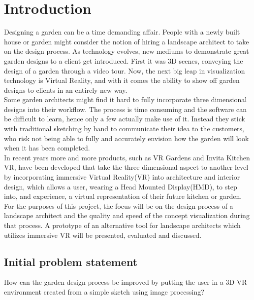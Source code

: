 \chapter{Introduction}
	Designing a garden can be a time demanding affair. People with a newly built house or garden might consider the notion of hiring a landscape architect to take on the design process. As technology evolves, new mediums to demonstrate great garden designs to a client get introduced\cite{landscapeArchitectureDigiTech}. First it was 3D scenes, conveying the design of a garden through a video tour. Now, the next big leap in visualization technology is Virtual Reality\cite{VRS}, and with it comes the ability to show off garden designs to clients in an entirely new way.\\
	
	Some garden architects might find it hard to fully incorporate three dimensional designs into their workflow. The process is time consuming and the software can be difficult to learn, hence only a few actually make use of it. Instead they stick with traditional sketching by hand to communicate their idea to the customers, who risk not being able to fully and accurately envision how the garden will look when it has been completed.\\
	
	In recent years more and more products, such as VR Gardens and Invita Kitchen VR, have been developed that take the three dimensional aspect to another level by incorporating immersive Virtual Reality(VR) into architecture and interior design, which allows a user, wearing a Head Mounted Display(HMD), to step into, and experience, a virtual representation of their future kitchen or garden.\\
	
	For the purposes of this project, the focus will be on the design process of a landscape architect and the quality and speed of the concept visualization during that process. A prototype of an alternative tool for landscape architects which utilizes immersive VR will be presented, evaluated and discussed.
	
	
	\section{Initial problem statement}
	How can the garden design process be improved by putting the user in a 3D VR environment created from a simple sketch using image processing?
	